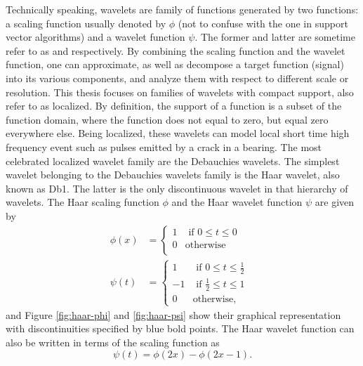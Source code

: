 \documentclass[../Main/thesis.tex]{subfiles}
\begin{document}
\justify
Technically speaking, wavelets are family of functions generated by two functions: a scaling function usually denoted by $\phi$ (not to confuse with the one in support vector algorithms) and a wavelet function $\psi$. The former and latter are sometime refer to as  and  respectively. By combining the scaling function and the wavelet function, one can approximate, as well as decompose a target function (signal) into its various components, and analyze them with respect to different scale or resolution. This thesis focuses on families of wavelets with compact support, also refer to as localized. By definition, the support of a function is a subset of the function domain, where the function does not equal to zero, but equal zero everywhere else. Being localized, these wavelets can model local short time high frequency event such as pulses emitted by a crack in a bearing. The most celebrated localized wavelet family are the Debauchies wavelets. 
\justify
The simplest wavelet belonging to the Debauchies wavelets family is the Haar wavelet, also known as Db1. The latter is the only discontinuous wavelet in that hierarchy of wavelets.
The Haar scaling function $\phi$ and the Haar wavelet function $\psi$ are given by
\begin{equation}\label{eq:haar-wavelet}
\begin{split}
\phi(x) &=
  \begin{cases}
   1 & \text{ if $0 \leq t \le 0$} \\
    0 & \text{otherwise}\\
  \end{cases}\\
\psi(t)& =
  \begin{cases}
   1 & \text{ if $0 \leq t \le \frac{1}{2}$ } \\
    -1 & \text{ if  $\frac{1}{2} \leq t \le 1$ }\\
    0 & \text{otherwise},
  \end{cases}
  \end{split}
\end{equation}
and Figure \ref{fig:haar-phi} and \ref{fig:haar-psi} show their graphical representation with discontinuities specified by blue bold points. The Haar wavelet function can also be written in  terms of the scaling function as 
\begin{equation}
\psi(t) = \phi(2x)-\phi(2x-1) \nonumber.
\end{equation}
\end{document}
